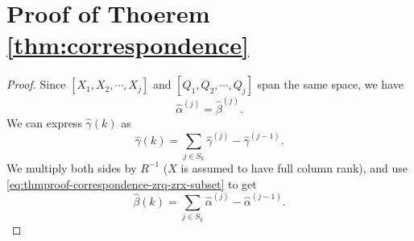 \section{Proof of Thoerem \ref{thm:correspondence}}
\label{sec:correspondence}

\begin{proof}	
	Since $[X_1,X_2,\cdots,X_j]$ and $[Q_1,Q_2,\cdots,Q_j]$ span the same space, we have
	\begin{equation}
	\hat{\alpha}^{(j)} = \hat{\beta}^{(j)}.
	\label{eq:thmproof-correspondence-zrq-zrx-subset}
	\end{equation}
	We can express $\hat{\gamma}(k)$ as
	\begin{equation}
		\hat{\gamma}(k) = \sum_{j\in S_k} \hat{\gamma}^{(j)} - \hat{\gamma}^{(j-1)}.
		\label{eq:zs_expand}
	\end{equation}
	We multiply both sides by $R^{-1}$ ($X$ is assumed to have full column rank), and use \eqref{eq:thmproof-correspondence-zrq-zrx-subset} to get
	\begin{equation*}
		\hat{\beta}(k) = \sum_{j\in S_k} \hat{\alpha}^{(j)} - \hat{\alpha}^{(j-1)}.
	\end{equation*}
	\iffalse
	 \eqref{eq:thmproof-correspondence-conclusion} tells us that when certain subset $Q_S$ is chosen, the coefficients projected from the $Q$ space, correspond to a linear combination of multiple regression coefficients of $y$ upon subsets in $X$, where these subsets are sequential. For example, in the simple $2$-predictor case, if $Q_2$ is the chosen predictor, by \eqref{eq:thmproof-correspondence-conclusion}, we get:
	\begin{equation*}
	\hat{\beta}^{(Q_2)} = \hat{\beta}^{(X_1,X_2)} - \hat{\beta}^{(X_1)}.
	\end{equation*}
	Hence, it corresponds to the difference between two regression coefficients, the coefficients of $y$ upon $X_1,X_2$, and the coefficients of $y$ upon just $X_1$. 
	\fi
\end{proof}

